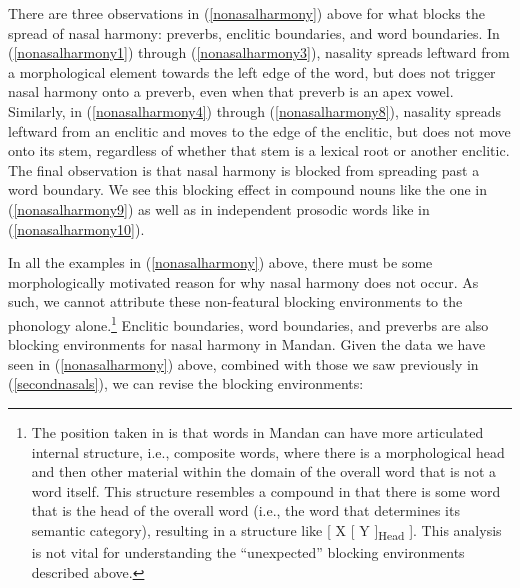 There are three observations in (\ref{nonasalharmony}) above for what blocks the spread of nasal harmony: preverbs, enclitic boundaries, and word boundaries. In (\ref{nonasalharmony1}) through (\ref{nonasalharmony3}), nasality spreads leftward from a morphological element towards the left edge of the word, but does not trigger nasal harmony onto a preverb, even when that preverb is an apex vowel. Similarly, in (\ref{nonasalharmony4}) through (\ref{nonasalharmony8}), nasality spreads leftward from an enclitic and moves to the edge of the enclitic, but does not move onto its stem, regardless of whether that stem is a lexical root or another enclitic. The final observation is that nasal harmony is blocked from spreading past a word boundary. We see this blocking effect in compound nouns like the one in (\ref{nonasalharmony9}) as well as in independent prosodic words like in (\ref{nonasalharmony10}).

In all the examples in (\ref{nonasalharmony}) above, there must be some morphologically motivated reason for why nasal harmony does not occur. As such, we cannot attribute these non-featural blocking environments to the phonology alone.\footnote{The position taken in \citet{kasak2019} is that words in Mandan can have more articulated internal structure, i.e., composite words, where there is a morphological head and then other material within the domain of the overall word that is not a word itself. This structure resembles a compound in that there is some word that is the head of the overall word (i.e., the word that determines its semantic category), resulting in a structure like [ X [ Y ]\textsubscript{Head} ]. This analysis is not vital for understanding the ``unexpected'' blocking environments described above.} Enclitic boundaries, word boundaries, and preverbs are also blocking environments for nasal harmony in Mandan. Given the data we have seen in (\ref{nonasalharmony}) above, combined with those we saw previously in (\ref{secondnasals}), we can revise the blocking environments:

